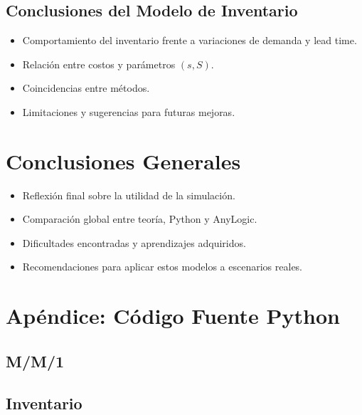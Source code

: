 \documentclass[12pt]{article}
\begin{document}
\subsection{Conclusiones del Modelo de Inventario}
\begin{itemize}
    \item Comportamiento del inventario frente a variaciones de demanda y lead time.
    \item Relación entre costos y parámetros $(s, S)$.
    \item Coincidencias entre métodos.
    \item Limitaciones y sugerencias para futuras mejoras.
\end{itemize}

\section{Conclusiones Generales}

\begin{itemize}
    \item Reflexión final sobre la utilidad de la simulación.
    \item Comparación global entre teoría, Python y AnyLogic.
    \item Dificultades encontradas y aprendizajes adquiridos.
    \item Recomendaciones para aplicar estos modelos a escenarios reales.
\end{itemize}

\appendix
\section{Apéndice: Código Fuente Python}
\subsection*{M/M/1}


\subsection*{Inventario}

\end{document}
